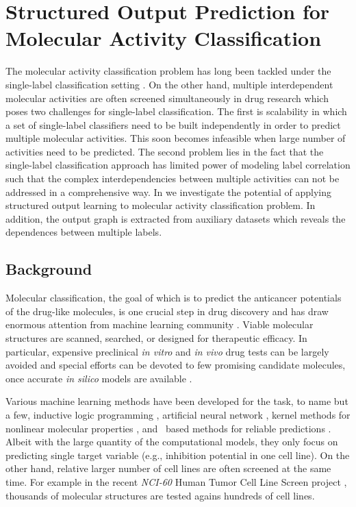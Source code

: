 {%
%
\section{Structured Output Prediction for Molecular Activity Classification} \label{sc_su10}

The molecular activity classification problem has long been tackled under the single-label classification setting \citep{Menchetti05weighted,Singh12qsar,Dutt12classification}.
On the other hand, multiple interdependent molecular activities are often screened simultaneously in drug research \citep{Shoemaker06the} which poses two challenges for single-label classification.
The first is scalability in which a set of single-label classifiers need to be built independently in order to predict multiple molecular activities.
This soon becomes infeasible when large number of activities need to be predicted.
The second problem lies in the fact that the single-label classification approach has limited power of modeling label correlation such that the complex interdependencies between multiple activities can not be addressed in a comprehensive way.
In  we investigate the potential of applying structured output learning to molecular activity classification problem.
In addition, the output graph is extracted from auxiliary datasets which reveals the dependences between multiple labels.


%
%
\subsection{Background}

Molecular classification, the goal of which is to predict the anticancer potentials of the drug-like molecules, is one crucial step in drug discovery and has draw enormous attention from machine learning community \citep{Singh12qsar,Dutt12classification}.
Viable molecular structures are scanned, searched, or designed for therapeutic efficacy.
In particular, expensive preclinical \textit{in vitro} and \textit{in vivo} drug tests can be largely avoided and special efforts can be devoted to few promising candidate molecules, once accurate \textit{in silico} models are available \citep{Burbidg01drug}.

Various machine learning methods have been developed for the task, to name but a few, inductive logic programming \citep{King96structure}, artificial neural network \citep{Bernazzani06predicting}, kernel methods for nonlinear molecular properties \citep{Trotter01drug,Ralaivola05graph,Swamidass05kernel,Ceroni07classification}, and \svm\ based methods for reliable predictions \citep{Trotter01drug,Byvatov03comparison,Xue04effect}.
Albeit with the large quantity of the computational models, they only focus on predicting single target variable (e.g., inhibition potential in one cell line). 
On the other hand, relative larger number of cell lines are often screened at the same time.
For example in the recent \textit{NCI-60} {Human Tumor Cell Line Screen} project \citep{Shoemaker06the}, thousands of molecular structures are tested agains hundreds of cell lines.



}
